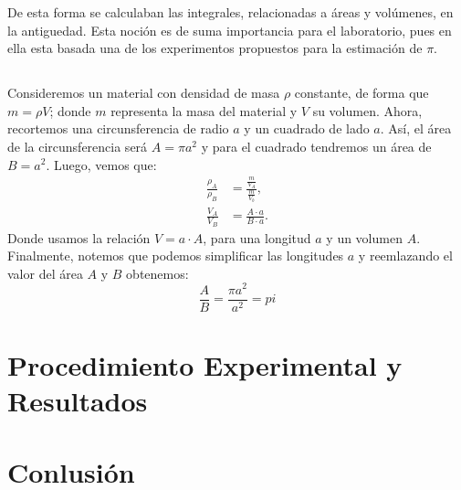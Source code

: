 \documentclass[10pt,a4paper]{article}
\begin{document}
\begin{multicols}{2}
		De esta forma se calculaban las integrales, relacionadas a áreas y volúmenes, en la antiguedad. Esta noción es de suma importancia para el laboratorio, pues en ella esta basada una de los experimentos propuestos para la estimación de $\pi$.
		\subsection*{  }
		Consideremos un material con densidad de masa $\rho$ constante, de forma que $m = \rho V$; donde $m$ representa la masa del material y  $V$ su volumen. Ahora, recortemos una circunsferencia de radio $a$ y un cuadrado de lado $a$. Así, el área de la circunsferencia será $A = \pi a^2$ y para el cuadrado tendremos un área de $B = a^2$. Luego, vemos que:
		\begin{align*}
		\frac{\rho_A}{\rho_B} &= \frac{\frac{m}{V_A}}{\frac{m}{V_b}}, \\
		 \frac{V_A}{V_B} &= \frac{A \cdot a}{B \cdot a}.
		\end{align*}
		Donde usamos la relación $V = a \cdot A$, para una longitud $a$ y un volumen $A$. \\
		
		Finalmente, notemos que podemos simplificar las longitudes $a$ y reemlazando el valor del área $A$ y $B$ obtenemos:
		\begin{equation}\label{Relación de las áreas}
		\frac{A}{B} = \frac{\pi a^2}{a^2} = pi 
		\end{equation}
		\section{Procedimiento Experimental y Resultados}
		
		
	
	
	
		
		
	

	
\section{Conlusión}





	
	
	
	\end{multicols}
\end{document}
